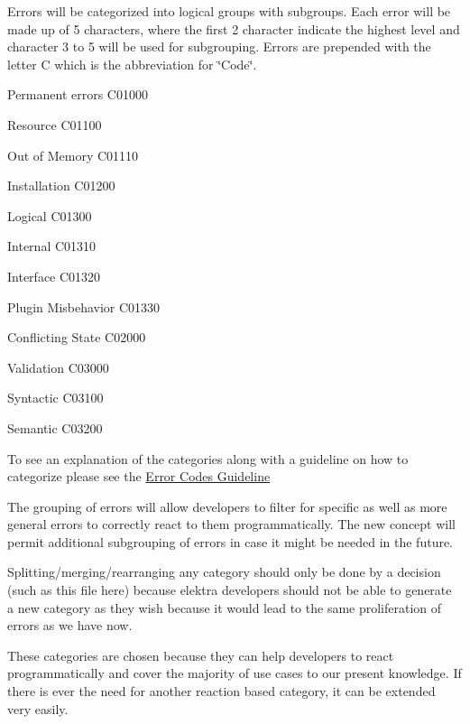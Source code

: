Errors will be categorized into logical groups with subgroups. Each error will be made up of 5 characters, where the first 2 character indicate the highest level and character 3 to 5 will be used for subgrouping. Errors are prepended with the letter {\ttfamily C} which is the abbreviation for \char`\"{}\+Code\char`\"{}.


\begin{DoxyItemize}
\item Permanent errors C01000
\begin{DoxyItemize}
\item Resource C01100
\begin{DoxyItemize}
\item Out of Memory C01110
\end{DoxyItemize}
\item Installation C01200
\item Logical C01300
\begin{DoxyItemize}
\item Internal C01310
\item Interface C01320
\item Plugin Misbehavior C01330
\end{DoxyItemize}
\end{DoxyItemize}
\item Conflicting State C02000
\item Validation C03000
\begin{DoxyItemize}
\item Syntactic C03100
\item Semantic C03200
\end{DoxyItemize}
\end{DoxyItemize}

To see an explanation of the categories along with a guideline on how to categorize please see the \hyperlink{doc_dev_error-categorization_md}{Error Codes Guideline}

The grouping of errors will allow developers to filter for specific as well as more general errors to correctly react to them programmatically. The new concept will permit additional subgrouping of errors in case it might be needed in the future.

Splitting/merging/rearranging any category should only be done by a decision (such as this file here) because elektra developers should not be able to generate a new category as they wish because it would lead to the same proliferation of errors as we have now.

These categories are chosen because they can help developers to react programmatically and cover the majority of use cases to our present knowledge. If there is ever the need for another reaction based category, it can be extended very easily.

